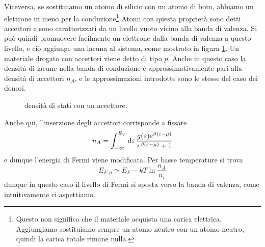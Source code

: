 \documentclass[a4paper, 11pt]{article}
\begin{document}
	Viceversa, se sostituiamo un atomo di silicio con un atomo di boro, abbiamo un elettrone in meno per la conduzione\footnote{Questo non significa che il materiale acquista una carica elettrica. Aggiungiamo sostituiamo sempre un atomo neutro con un atomo neutro, quindi la carica totale rimane nulla.} Atomi con questa proprietà sono detti accettori e sono caratterizzati da un livello vuoto vicino alla banda di valenza. Si può quindi promuovere facilmente un elettrone dalla banda di valenza a questo livello, e ciò aggiunge una lacuna al sistema, come mostrato in figura \ref{fig:accettori}. Un materiale drogato con accettori viene detto di tipo $p$.  Anche in questo caso la densità di lacune nella banda di conduzione è approssimativamente pari alla densità di accettori $n_A$, e le approssimazioni introdotte sono le stesse del caso dei donori.
		\begin{figure}[h!]
		\centering
		\caption{densità di stati con un accettore.}
		\label{fig:accettori}
	\end{figure}
	Anche qui, l'inserzione degli accettori corrisponde a fissare
	\[n_A=\int_{-\infty}^{E_V}\mathrm{d}\varepsilon\,\frac{g(\varepsilon)e^{\beta(\varepsilon-\mu)}}{e^{\beta(\varepsilon-\mu)}+1}\]
	e dunque l'energia di Fermi viene modificata. Per basse temperature si trova
	\[E_{F,p}\simeq E_F-kT\ln\frac{n_A}{n_i}\]
	dunque in questo caso il livello di Fermi si sposta verso la banda di valenza, come intuitivamente ci aspettiamo.
	
\end{document}
